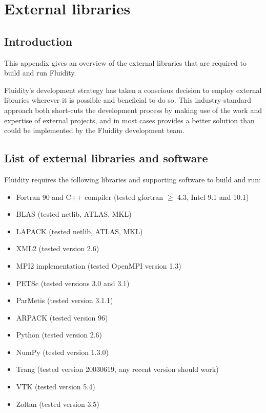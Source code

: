 \chapter{External libraries}\label{chap:external}

\section{Introduction}

This appendix gives an overview of the external libraries that are required to
build and run Fluidity.

Fluidity's development strategy has taken a conscious decision to employ
external libraries wherever it is possible and beneficial to do so. This
industry-standard approach both short-cuts the development process by making
use of the work and expertise of external projects, and in most cases provides
a better solution than could be implemented by the Fluidity development team.

\section{List of external libraries and software}
\label{sect:required_ḻibraries_list}

Fluidity requires the following libraries and supporting software to build and
run:

\begin{itemize}
\item Fortran 90 and C++ compiler (tested gfortran $\geq$ 4.3, Intel 9.1 and 10.1)
\item BLAS (tested netlib, ATLAS, MKL)
\item LAPACK (tested netlib, ATLAS, MKL)
\item XML2 (tested version 2.6)
\item MPI2 implementation (tested OpenMPI version 1.3)
\item PETSc (tested versions 3.0 and 3.1)
\item ParMetis (tested version 3.1.1)
\item ARPACK (tested version 96)
\item Python (tested version 2.6) 
\item NumPy (tested version 1.3.0)
\item Trang (tested version 20030619, any recent version should work)
\item VTK (tested version 5.4)
\item Zoltan (tested version 3.5)
\end{itemize}

